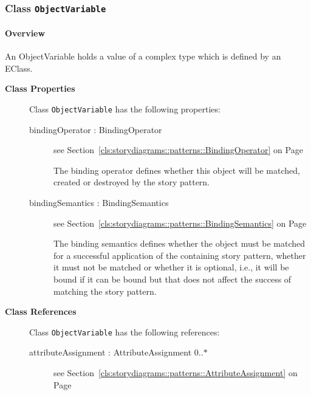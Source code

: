 \subsubsection{\Large{Class \bfseries \texttt{ObjectVariable}\normalfont}}
\label{cls:storydiagrams::patterns::ObjectVariable} 
\paragraph{Overview}

	
			
An ObjectVariable holds a value of a complex type which is defined by an EClass. 	
		
	


\begin{description}

	\item[\textbf{Class Properties}] Class \texttt{ObjectVariable} has the following properties:
	\begin{description}
\item[bindingOperator : BindingOperator 	]
see Section~\ref{cls:storydiagrams::patterns::BindingOperator} on Page~\pageref{cls:storydiagrams::patterns::BindingOperator}
\hspace{\fill}
\nopagebreak


	
			
The binding operator defines whether this object will be matched, created or destroyed by the story pattern.	
		
	
\item[bindingSemantics : BindingSemantics 	]
see Section~\ref{cls:storydiagrams::patterns::BindingSemantics} on Page~\pageref{cls:storydiagrams::patterns::BindingSemantics}
\hspace{\fill}
\nopagebreak


	
			
The binding semantics defines whether the object must be matched for a successful application of the containing story pattern, whether it must not be matched or whether it is optional, i.e., it will be bound if it can be bound but that does not affect the success of matching the story pattern.	
		
	
	\end{description}
	
	\item[\textbf{Class References}] Class \texttt{ObjectVariable} has the following references:
	\begin{description}
\item[attributeAssignment : AttributeAssignment 			0..$*$]
see Section~\ref{cls:storydiagrams::patterns::AttributeAssignment} on Page~\pageref{cls:storydiagrams::patterns::AttributeAssignment}
\hspace{\fill}
\nopagebreak



\end{description}
\end{description}

